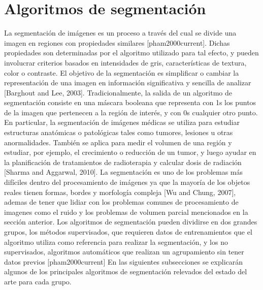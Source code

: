 \section{Algoritmos de segmentación}
La segmentación de imágenes es un proceso a través del cual se divide una imagen en regiones con propiedades similares [pham2000current]. Dichas propiedades son determinadas por el algoritmo utilizado para tal efecto, y pueden involucrar criterios basados en intensidades de gris, características de textura, color o contraste. El objetivo de la segmentación es simplificar o cambiar la representación de una imagen en información significativa y sencilla de analizar [Barghout and Lee, 2003]. Tradicionalmente, la salida de un algoritmo de segmentación consiste en una máscara booleana que representa con 1s los puntos de la imagen que pertenecen a la región de interés, y con 0s cualquier otro punto. En particular, la segmentación de imágenes médicas se utiliza para estudiar estructuras anatómicas o patológicas tales como tumores, lesiones u otras anormalidades. También se aplica para medir el volumen de una región y estudiar, por ejemplo, el crecimiento o reducción de un tumor, y luego ayudar en la planificación de tratamientos de radioterapia y calcular dosis de radiación [Sharma and Aggarwal, 2010]. 
La segmentación es uno de los problemas más difíciles dentro del procesamiento de imágenes ya que la mayoría de los objetos reales tienen formas, bordes y morfología compleja [Wu and Chung, 2007], ademas de tener que lidiar con los problemas comunes de procesamiento de imagenes como el ruido y los problemas de volumen parcial mencionados en la sección anterior. 
Los algoritmos de segmentación pueden dividirse en dos grandes grupos, los métodos supervisados, que requieren datos de entrenamientos que el algoritmo utiliza como referencia para realizar la segmentación, y los no supervisados, algoritmos automáticos que realizan un agrupamiento sin tener datos previos [pham2000current]
En las siguientes subsecciones se explicarán algunos de los principales algoritmos de segmentación relevados del estado del arte para cada grupo.

